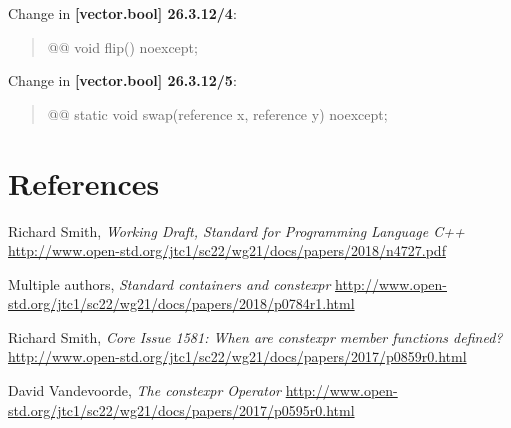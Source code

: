 \documentclass{wg21}
\begin{document}
Change in \textbf{[vector.bool] 26.3.12/4}:
\begin{quote}
\begin{itemdecl}
@@ void flip() noexcept;
\end{itemdecl}
\end{quote}

Change in \textbf{[vector.bool] 26.3.12/5}:
\begin{quote}
\begin{itemdecl}
@@ static void swap(reference x, reference y) noexcept;
\end{itemdecl}
\end{quote}


\section{References}
\renewcommand{\section}[2]{}%
\begin{thebibliography}{9}

  Richard Smith,
  \emph{Working Draft, Standard for Programming Language C++}\newline
  \url{http://www.open-std.org/jtc1/sc22/wg21/docs/papers/2018/n4727.pdf}

  Multiple authors,
  \emph{Standard containers and constexpr}\newline
  \url{http://www.open-std.org/jtc1/sc22/wg21/docs/papers/2018/p0784r1.html}

  Richard Smith,
  \emph{Core Issue 1581: When are constexpr member functions defined?}\newline
  \url{http://www.open-std.org/jtc1/sc22/wg21/docs/papers/2017/p0859r0.html}

  David Vandevoorde,
  \emph{The constexpr Operator}\newline
  \url{http://www.open-std.org/jtc1/sc22/wg21/docs/papers/2017/p0595r0.html}

\end{thebibliography}
\end{document}
